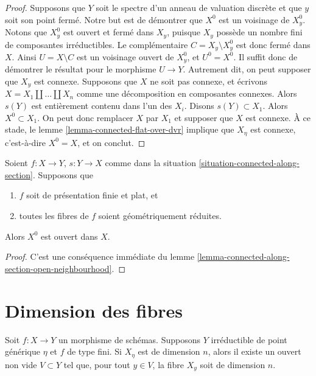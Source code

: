 \begin{proof}
\medskip\noindent
Supposons que $Y$ soit le spectre d'un anneau de valuation discrète et que $y$ soit son point
fermé. Notre but est de démontrer que $X^0$ est un voisinage de $X^0_y$.
Notons que $X^0_y$ est ouvert et fermé dans $X_y$, puisque $X_y$ possède un nombre fini
de composantes irréductibles. Le complémentaire $C = X_y \setminus X_y^0$
est donc fermé dans $X$. Ainsi $U = X \setminus C$ est un voisinage ouvert de
$X^0_y$, et $U^0 = X^0$. Il suffit donc de démontrer le résultat pour le
morphisme $U \to Y$. Autrement dit, on peut supposer que
$X_y$ est connexe. Supposons que $X$ ne soit pas connexe, et écrivons
$X = X_1 \amalg \ldots \amalg X_n$ comme une décomposition en composantes
connexes. Alors $s(Y)$ est entièrement contenu dans l'un des $X_i$.
Disons $s(Y) \subset X_1$. Alors $X^0 \subset X_1$. On peut donc remplacer
$X$ par $X_1$ et supposer que $X$ est connexe. À ce stade, le
lemme \ref{lemma-connected-flat-over-dvr}
implique que $X_\eta$ est connexe, c'est-à-dire $X^0 = X$, et on conclut.
\end{proof}

\begin{lemma}
\label{lemma-connected-along-section-open}
Soient $f : X \to Y$, $s : Y \to X$ comme dans la
situation \ref{situation-connected-along-section}.
Supposons que
\begin{enumerate}
\item $f$ soit de présentation finie et plat, et
\item toutes les fibres de $f$ soient géométriquement réduites.
\end{enumerate}
Alors $X^0$ est ouvert dans $X$.
\end{lemma}

\begin{proof}
C'est une conséquence immédiate du
lemme \ref{lemma-connected-along-section-open-neighbourhood}.
\end{proof}

\section{Dimension des fibres}
\label{section-dimension}

\begin{lemma}
\label{lemma-dimension-in-neighbourhood}
Soit $f : X \to Y$ un morphisme de schémas. Supposons $Y$ irréductible de
point générique $\eta$ et $f$ de type fini. Si $X_\eta$ est de dimension $n$,
alors il existe un ouvert non vide $V \subset Y$
tel que, pour tout $y \in V$, la fibre $X_y$ soit de dimension $n$.
\end{lemma}


